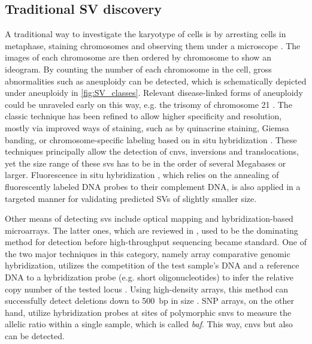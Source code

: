 \subsection{Traditional SV discovery}
\label{sec:sv_detection_old}

A traditional way to investigate the karyotype of cells is by arresting cells in
metaphase, staining chromosomes and observing them under a microscope
\citep{Speicher2005}. The images of each chromosome are then ordered by
chromosome to show an ideogram. By counting the number of each chromosome in the
cell, gross abnormalities such as aneuploidy can be detected, which is
schematically depicted under aneuploidy in \cref{fig:SV_classes}. Relevant
disease-linked forms of aneuploidy could be unraveled early on this way, e.g.
the trisomy of chromosome 21 \citep{Lejeune1959}. The classic technique has been
refined to allow higher specificity and resolution, mostly via improved ways of
staining, such as by quinacrine staining, Giemsa banding, or chromosome-specific
labeling based on in situ hybridization \citep{Speicher2005}. These techniques
principally allow the detection of \acp{cnv}, inversions and translocations,
yet the size range of these \acp{sv} has to be in the order of several Megabases
or larger. Fluorescence in situ hybridization \citep{Bauman1980}, which relies
on the annealing of fluorescently labeled DNA probes to their complement DNA,
is also applied in a targeted manner for validating predicted SVs of slightly
smaller size.

Other means of detecting \acp{sv} include optical mapping
\citep{Schwartz1993,Teague2010} and hybridization-based microarrays. The latter
ones, which are reviewed in \citet{Alkan2011}, used to be the dominating method
for \cnv detection before high-throughput sequencing became standard. One of the
two major techniques in this category, namely array comparative genomic
hybridization, utilizes the competition of the test sample's DNA and a reference
DNA to a hybridization probe (e.g. short oligonucleotides) to infer the relative
copy number of the tested locus \citep{Snijders2001}. Using high-density arrays,
this method can successfully detect deletions down to 500~bp in size
\citep{Conrad2010}. SNP arrays, on the other hand, utilize hybridization probes
at sites of polymorphic \acp{snv} to measure the allelic ratio within a single
sample, which is called \emph{\acf{baf}}. This way, \acp{cnv} but also \loh can
be detected.






